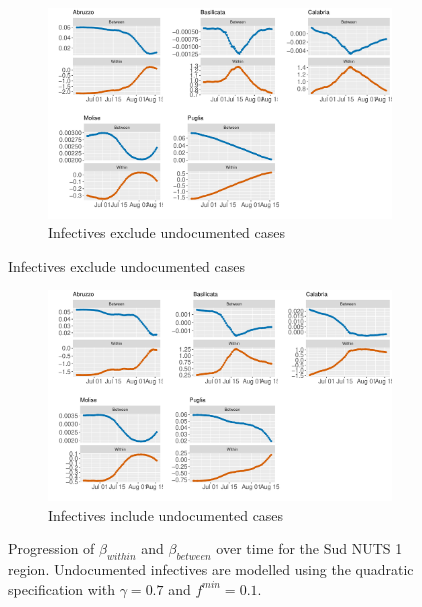 \documentclass[12pt]{article}
\begin{document}
\begin{appendices}
		\begin{figure}[H]
    	    \centering
    	    \begin{subfigure}{\textwidth}
    	      \centering
    	      \includegraphics[width=0.94\linewidth]{output/model_between_lag14_betas_Sud_rolling.pdf}
    	      \caption{Infectives exclude undocumented cases}
    	      \label{fig:beta_between_over_time_sud_regular}
    	    \end{subfigure}
        \end{figure}
        \begin{figure}[H]\ContinuedFloat
    	    \begin{subfigure}{\textwidth}
    	      \centering
    	      \includegraphics[width=0.94\linewidth]{output/model_between_lag14_betas_Sud_UndocQuadratic_rolling.pdf}
    	      \caption{Infectives include undocumented cases}
    	      \label{fig:beta_between_over_time_sud_regular_undoc}
    	    \end{subfigure}
    	    \caption{Progression of $\beta_{within}$ and $\beta_{between}$ over time for the Sud NUTS 1 region. Undocumented infectives are modelled using the quadratic specification with $\gamma = 0.7$ and $f^{min}=0.1$.}
    	    \label{fig:beta_between_over_time_sud}
        \end{figure}
		

\end{appendices}
\end{document}
